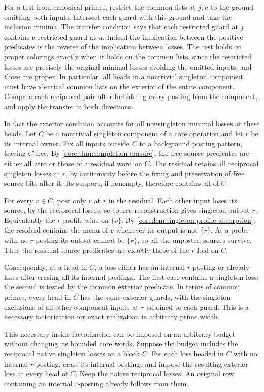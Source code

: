 For a test from canonical primes, restrict the common
lists at $j,u$ to the ground omitting both inputs.
Intersect each guard with this ground and take the
inclusion minima. The transfer condition says that
each restricted guard at $j$ contains a restricted
guard at $u$. Indeed the implication between the
positive predicates is the reverse of the implication
between losses. The test holds on proper colorings
exactly when it holds on the common lists, since the
restricted losses are precisely the original minimal
losses avoiding the omitted inputs, and those are
proper. In particular, all heads in a nontrivial
singleton component must have identical common lists
on the exterior of the entire component. Compare
each reciprocal pair after forbidding every posting
from the component, and apply the transfer in both
directions.

In fact the exterior condition accounts for all
nonsingleton minimal losses at these heads. Let $C$
be a nontrivial singleton component of a core operation
and let $r$ be its internal owner. Fix all inputs
outside $C$ to a background posting pattern, leaving
$C$ free. By \cref{core:thm:completion-erasure}, the
free source predicates are either all zero or those
of a residual word on $C$. The residual retains
all reciprocal singleton losses at $r$, by
antitonicity before the fixing and preservation
of free source bits after it. Its support, if
nonempty, therefore contains all of $C$.

For every $v\in C$, post only $v$ at $r$ in the
residual. Each other input loses its source, by
the reciprocal losses, so source reconstruction
gives singleton output $r$. Equivalently the
$r$-profile wins on $\{v\}$. By
\cref{core:lem:singleton-profile-absorption}, the
residual contains the menu of $v$ whenever its
output is not $\{r\}$. At a probe with no $r$-posting
its output cannot be $\{r\}$, so all the unposted
sources survive. Thus the residual source predicates
are exactly those of the $r$-fold on $C$.

Consequently, at a head in $C$, a loss either has
an internal $r$-posting or already loses after
erasing all its internal postings. The first
case contains a singleton loss; the second is
tested by the common exterior predicate. In terms
of common primes, every head in $C$ has the same
exterior guards, with the singleton exclusions of
all other component inputs at $r$ adjoined to
each guard. This is a necessary factorization
for exact realization in arbitrary prime width.

This necessary inside factorization can be imposed
on an arbitrary budget without changing its bounded
core words. Suppose the budget includes the reciprocal
native singleton losses on a block $C$. For each
loss headed in $C$ with no internal $r$-posting,
erase its internal postings and impose the resulting
exterior loss at every head of $C$. Keep the native
reciprocal losses. An original row containing an
internal $r$-posting already follows from them.


